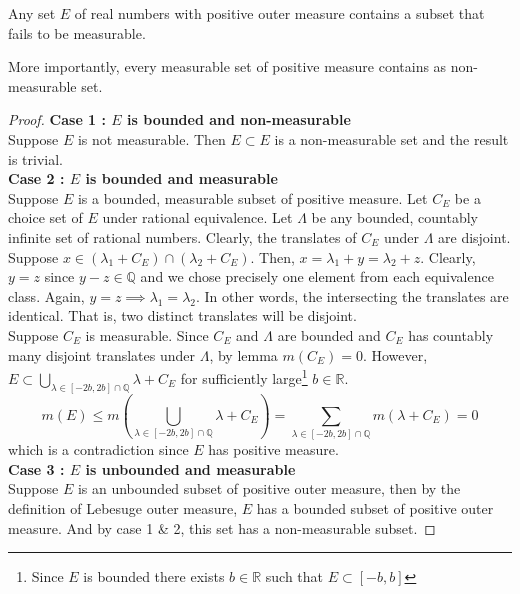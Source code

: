 \begin{theorem}[Vitali]
	Any set $E$ of real numbers with positive outer measure contains a subset that fails to be measurable.
\end{theorem}
	More importantly, every measurable set of positive measure contains as non-measurable set.
\begin{proof}
	\textbf{Case 1 : $E$ is bounded and non-measurable}\\
	Suppose $E$ is not measurable.
	Then $E \subset E$ is a non-measurable set and the result is trivial.\\

	\textbf{Case 2 : $E$ is bounded and measurable}\\
	Suppose $E$ is a bounded, measurable subset of positive measure.
	Let $C_E$ be a choice set of $E$ under rational equivalence.
	Let $\Lambda$ be any bounded, countably infinite set of rational numbers.
	Clearly, the translates of $C_E$ under $\Lambda$ are disjoint.\\

	Suppose $x \in (\lambda_1 + C_E) \cap (\lambda_2 + C_E)$.
	Then, $x = \lambda_1 + y = \lambda_2 + z$.
	Clearly, $y = z$ since $y-z \in \mathbb{Q}$ and we chose precisely one element from each equivalence class.
	Again, $y = z \implies \lambda_1 = \lambda_2$.
	In other words, the intersecting the translates are identical.
	That is, two distinct translates will be disjoint.\\

	Suppose $C_E$ is measurable.
	Since $C_E$ and $\Lambda$ are bounded and $C_E$ has countably many disjoint translates under $\Lambda$, by lemma $m(C_E) = 0$.
	However, $\displaystyle E \subset \!\!\! \bigcup_{\lambda \in [-2b,2b] \cap \mathbb{Q}} \!\!\!\!\!\! \lambda+C_E$ for sufficiently large\dag\footnote{
		Since $E$ is bounded there exists $b \in \mathbb{R}$ such that $E \subset [-b,b]$}
	$b \in \mathbb{R}$.
	\begin{equation*}
		m(E) \le m \left(\bigcup_{\lambda \in [-2b,2b]\cap \mathbb{Q}} \!\!\!\!\!\! \lambda + C_E \right)= \sum_{\lambda \in [-2b,2b] \cap\mathbb{Q}} m(\lambda+C_E) = 0
	\end{equation*}
	which is a contradiction since $E$ has positive measure.\\

	\textbf{Case 3 : $E$ is unbounded and measurable}\\
	Suppose $E$ is an unbounded subset of positive outer measure, then by the definition of Lebesuge outer measure, $E$ has a bounded subset of positive outer measure.
	And by case 1 \& 2, this set has a non-measurable subset.
\end{proof}

